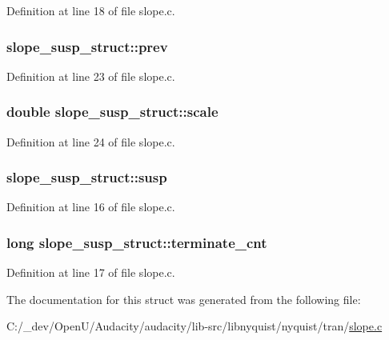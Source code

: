 Definition at line 18 of file slope.\+c.

\subsubsection[{\texorpdfstring{prev}{prev}}]{ slope\+\_\+susp\+\_\+struct\+::prev}\hypertarget{structslope__susp__struct_aae4e431c1e6aeeb7c9653165ea891b09}{}\label{structslope__susp__struct_aae4e431c1e6aeeb7c9653165ea891b09}


Definition at line 23 of file slope.\+c.

\subsubsection[{\texorpdfstring{scale}{scale}}]{\setlength{\rightskip}{0pt plus 5cm}double slope\+\_\+susp\+\_\+struct\+::scale}\hypertarget{structslope__susp__struct_a94cc5e05c174e8b91ceadc8d6701b431}{}\label{structslope__susp__struct_a94cc5e05c174e8b91ceadc8d6701b431}


Definition at line 24 of file slope.\+c.

\subsubsection[{\texorpdfstring{susp}{susp}}]{ slope\+\_\+susp\+\_\+struct\+::susp}\hypertarget{structslope__susp__struct_a4ec4a67f4a5e3f9c2314070e48fcd79c}{}\label{structslope__susp__struct_a4ec4a67f4a5e3f9c2314070e48fcd79c}


Definition at line 16 of file slope.\+c.

\subsubsection[{\texorpdfstring{terminate\+\_\+cnt}{terminate_cnt}}]{\setlength{\rightskip}{0pt plus 5cm}long slope\+\_\+susp\+\_\+struct\+::terminate\+\_\+cnt}\hypertarget{structslope__susp__struct_a579633a5410bb4df88e6ab943f19c706}{}\label{structslope__susp__struct_a579633a5410bb4df88e6ab943f19c706}


Definition at line 17 of file slope.\+c.



The documentation for this struct was generated from the following file\+:\begin{DoxyCompactItemize}
\item 
C\+:/\+\_\+dev/\+Open\+U/\+Audacity/audacity/lib-\/src/libnyquist/nyquist/tran/\hyperlink{slope_8c}{slope.\+c}\end{DoxyCompactItemize}
